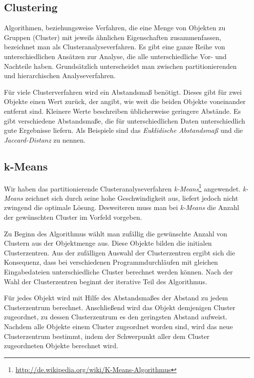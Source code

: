 \documentclass[a4paper]{llncs}
\begin{document}
\subsection{Clustering}
Algorithmen, beziehungsweise Verfahren, die eine Menge von Objekten zu Gruppen (Cluster) mit jeweils ähnlichen Eigenschaften zusammenfassen, bezeichnet man als Clusteranalyseverfahren.
Es gibt eine ganze Reihe von unterschiedlichen Ansätzen zur Analyse, die alle unterschiedliche Vor- und Nachteile haben.
Grundsätzlich unterscheidet man zwischen partitionierenden und hierarchischen Analyseverfahren.

Für viele Clusterverfahren wird ein Abstandsmaß benötigt. Dieses gibt für zwei Objekte einen Wert zurück, der angibt, wie weit die beiden Objekte voneinander entfernt sind. Kleinere Werte beschreiben üblicherweise geringere Abstände. Es gibt verschiedene Abstandsmaße, die für unterschiedlichen Daten unterschiedlich gute Ergebnisse liefern. Als Beispiele sind das \emph{Euklidische Abstandsmaß} und die \emph{Jaccard-Distanz} zu nennen.

\subsection{k-Means}
Wir haben das partitionierende Clusteranalyseverfahren \emph{k-Means}\footnote{\url{http://de.wikipedia.org/wiki/K-Means-Algorithmus}} angewendet. %
\emph{k-Means} zeichnet sich durch seine hohe Geschwindigkeit aus, liefert jedoch nicht zwingend die optimale Lösung. Desweiteren muss man bei \emph{k-Means} die Anzahl der gewünschten Cluster im Vorfeld vorgeben.

Zu Beginn des Algorithmus wählt man zufällig die gewünschte Anzahl von Clustern aus der Objektmenge aus. Diese Objekte bilden die initialen Clusterzentren. Aus der zufälligen Auswahl der Clusterzentren ergibt sich die Konsequenz, dass bei verschiedenen Programmdurchläufen mit gleichen Eingabedateien unterschiedliche Cluster berechnet werden können. Nach der Wahl der Clusterzentren beginnt der iterative Teil des Algorithmus.

Für jedes Objekt wird mit Hilfe des Abstandsmaßes der Abstand zu jedem Clusterzentrum berechnet. Anschließend wird das Objekt demjenigen Cluster zugeordnet, zu dessen Clusterzentrum es den geringsten Abstand aufweist.
Nachdem alle Objekte einem Cluster zugeordnet worden sind, wird das neue Clusterzentrum bestimmt, indem der Schwerpunkt aller dem Cluster zugeordneten Objekte berechnet wird.
\end{document}
